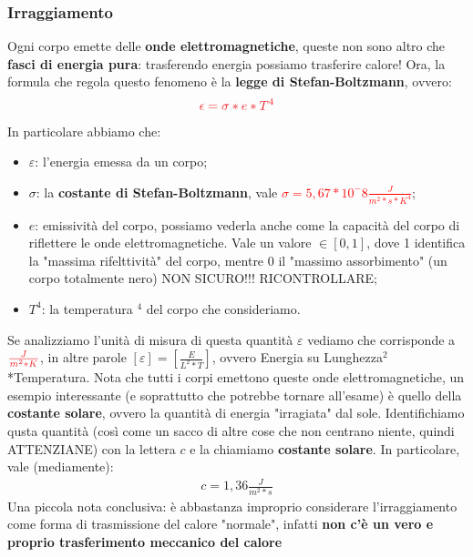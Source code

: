         \subsubsection{Irraggiamento}
            Ogni corpo emette delle \textbf{onde elettromagnetiche}, queste non sono altro che \textbf{fasci di energia pura}: trasferendo energia possiamo trasferire calore! Ora, la formula che regola questo fenomeno è la \textbf{legge di Stefan-Boltzmann}, ovvero:
            \begin{align*}
                \textcolor{Red}{\epsilon=\sigma*e*T^4}
            \end{align*}
            In particolare abbiamo che:
            \begin{itemize}
                \item $\varepsilon$: l'energia emessa da un corpo;
                \item $\sigma$: la \textbf{costante di Stefan-Boltzmann}, vale \textcolor{Red}{$\sigma=5,67*10^-8\frac{J}{m^2*s*K^4}$};
                \item $e$: emissività del corpo, possiamo vederla anche come la capacità del corpo di riflettere le onde elettromagnetiche. Vale un valore $\in [0, 1]$, dove 1 identifica la "massima rifelttività" del corpo, mentre 0 il "massimo assorbimento" (un corpo totalmente nero) NON SICURO!!! RICONTROLLARE;
                \item $T^4$: la temperatura $^4$ del corpo che consideriamo.
            \end{itemize}
            Se analizziamo l'unità di misura di questa quantità $\varepsilon$ vediamo che corrisponde a $\textcolor{Red}{\frac{J}{m^2*K}}$, in altre parole $[\varepsilon]=[\frac{E}{L^2*T}]$, ovvero Energia su Lunghezza$^2$*Temperatura.
            Nota che tutti i corpi emettono queste onde elettromagnetiche, un esempio interessante (e soprattutto che potrebbe tornare all'esame) è quello della \textbf{costante solare}, ovvero la quantità di energia "irragiata" dal sole. Identifichiamo qusta quantità (così come un sacco di altre cose che non centrano niente, quindi ATTENZIANE) con la lettera $c$ e la chiamiamo \textbf{costante solare}. In particolare, vale (mediamente):
            \begin{align*}
                c=1,36\frac{J}{m^2*s}
            \end{align*}
            Una piccola nota conclusiva: è abbastanza improprio considerare l'irraggiamento come forma di trasmissione del calore "normale", infatti \textbf{non c'è un vero e proprio trasferimento meccanico del calore}

